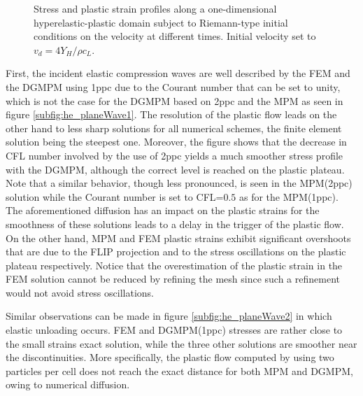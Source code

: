 \begin{figure}[h!]
  \centering
  {}
  {}
  {}
  {}
  {}
  {}
  {}
  {}
  {}
  
  
  
  \caption{Stress and plastic strain profiles along a one-dimensional hyperelastic-plastic domain subject to Riemann-type initial conditions on the velocity at different times. Initial velocity set to $v_d=4Y_H/\rho c_L$.
  }
  \label{fig:hep_planeWave_high}
\end{figure}
First, the incident elastic compression waves are well described by the FEM and the DGMPM using 1ppc due to the Courant number that can be set to unity, which is not the case for the DGMPM based on 2ppc and the MPM as seen in figure \ref{subfig:he_planeWave1}. 
The resolution of the plastic flow leads on the other hand to less sharp solutions for all numerical schemes, the finite element solution being the steepest one.
Moreover, the figure shows that the decrease in CFL number involved by the use of 2ppc yields a much smoother stress profile with the DGMPM, although the correct level is reached on the plastic plateau.
Note that a similar behavior, though less pronounced, is seen in the MPM(2ppc) solution while the Courant number is set to CFL=$0.5$ as for the MPM(1ppc).
The aforementioned diffusion has an impact on the plastic strains for the smoothness of these solutions leads to a delay in the trigger of the plastic flow.
On the other hand, MPM and FEM plastic strains exhibit significant overshoots that are due to the FLIP projection \cite{Thesis} and to the stress oscillations on the plastic plateau respectively.
Notice that the overestimation of the plastic strain in the FEM solution cannot be reduced by refining the mesh since such a refinement would not avoid stress oscillations.

Similar observations can be made in figure \ref{subfig:he_planeWave2} in which elastic unloading occurs.
FEM and DGMPM(1ppc) stresses are rather close to the small strains exact solution, while the three other solutions are smoother near the discontinuities.
More specifically, the plastic flow computed by using two particles per cell does not reach the exact distance for both MPM and DGMPM, owing to numerical diffusion.


